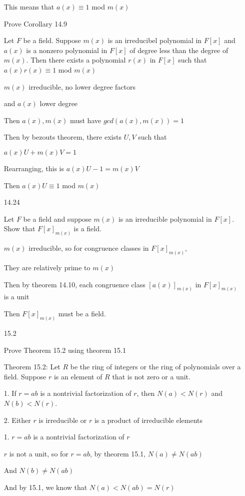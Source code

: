 \documentclass[12pt]{article}
\begin{document}
\begin{itemize}
	This means that $a(x) \equiv 1$ mod $m(x)$

	Prove Corollary 14.9

	Let $F$ be a field. Suppose $m(x)$ is an irreducibel polynomial in $F[x]$ and $a(x)$ is a nonzero polynomial in $F[x]$ of degree less than the degree of $m(x)$. Then there exists a polynomial $r(x)$ in $F[x]$ such that $a(x)r(x) \equiv 1$ mod $m(x)$

	$m(x)$ irreducible, no lower degree factors

	and $a(x)$ lower degree

	Then $a(x), m(x)$ must have $gcd(a(x),m(x)) = 1$

	Then by bezouts theorem, there exists $U,V$ such that

	$a(x)U + m(x)V = 1$

	Rearranging, this is $a(x)U - 1 = m(x)V$

	Then $a(x)U \equiv 1$ mod $m(x)$


\newpage 
\item[14.24]

	Let $F$ be a field and suppose $m(x)$ is an irreducible polynomial in $F[x]$. Show that $F[x]_{m(x)}$ is a field.

	$m(x)$ irreducible, so for congruence classes in $F[x]_{m(x)}$,

	They are relatively prime to $m(x)$

	Then by theorem 14.10, each congruence class $[a(x)]_{m(x)}$ in $F[x]_{m(x)}$ is a unit

	Then $F[x]_{m(x)}$ must be a field.

\newpage 
\item[15.2]

	Prove Theorem 15.2 using theorem 15.1

	Theorem 15.2:	Let $R$ be the ring of integers or the ring of polynomials over a field. Suppose $r$ is an element of $R$ that is not zero or a unit.

	1. If $r = ab$ is a nontrivial factorization of $r$, then $N(a) < N(r)$ and $N(b) < N(r)$.

	2. Either $r$ is irreducible or $r$ is a product of irreducible elements

	1. $r = ab$ is a nontrivial factorization of $r$

	$r$ is not a unit, so for $r = ab$, by theorem 15.1, $N(a) \neq N(ab)$

	And $N(b) \neq N(ab)$

	And by 15.1, we know that $N(a) < N(ab) = N(r)$


\end{itemize}
\end{document}
